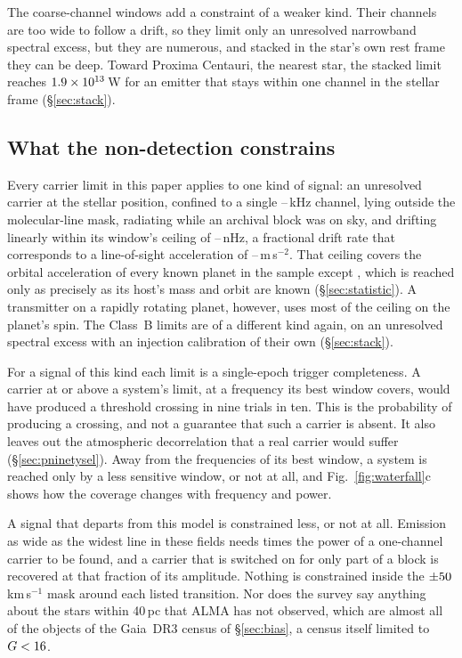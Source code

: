 The \NCoarse{} coarse-channel windows add a constraint of a weaker kind.
Their channels are too wide to follow a drift, so they limit only an
unresolved narrowband spectral excess, but they are numerous, and stacked in
the star's own rest frame they can be deep. Toward Proxima Centauri, the
nearest star, the stacked limit reaches $1.9\times10^{13}$\,W for an
emitter that stays within one channel in the stellar frame
(\S\ref{sec:stack}).

\subsection{What the non-detection constrains}
\label{sec:excludes}

Every carrier limit in this paper applies to one kind of signal: an unresolved
carrier at the stellar position, confined to a single
\ChanLoA--\ChanHiA\,kHz channel, lying outside the molecular-line mask,
radiating while an archival block was on sky, and drifting linearly within
its window's ceiling of \DriftCeilLo--\DriftCeilHi\,nHz, a fractional drift
rate that corresponds to a line-of-sight acceleration of
\AccelCeilMed--\AccelCeilMax\,m\,s$^{-2}$. That ceiling covers
the orbital acceleration of every known planet in the sample except
\AccelWorstName, which is reached only as precisely as its host's mass and
orbit are known (\S\ref{sec:statistic}). A transmitter on a rapidly rotating
planet, however, uses most of the ceiling on the planet's spin. The Class~B
limits are of a different kind again, on an unresolved spectral excess with
an injection calibration of their own (\S\ref{sec:stack}).

For a signal of this kind each limit is a single-epoch trigger
completeness. A carrier at or above a system's limit, at a frequency its
best window covers, would have produced a threshold crossing in nine trials
in ten. This is the probability of producing a crossing, and not a
guarantee that such a carrier is absent. It also leaves out the atmospheric
decorrelation that a real carrier would suffer (\S\ref{sec:pninetysel}).
Away from the frequencies of its best window, a system is reached only by a
less sensitive window, or not at all, and Fig.~\ref{fig:waterfall}c shows
how the coverage changes with frequency and power.

A signal that departs from this model is constrained less, or not at all.
Emission as wide as the widest line in these fields needs \ScNBroadRatio{}
times the power of a one-channel carrier to be found, and a carrier that is
switched on for only part of a block is recovered at that fraction of its
amplitude. Nothing is constrained inside the $\pm50$\,km\,s$^{-1}$
mask around each listed transition. Nor does the survey say anything about
the stars within 40\,pc that ALMA has not observed, which are almost all of
the \NGaiaCensus{} objects of the Gaia~DR3 census of \S\ref{sec:bias}, a
census itself limited to $G<16$.

